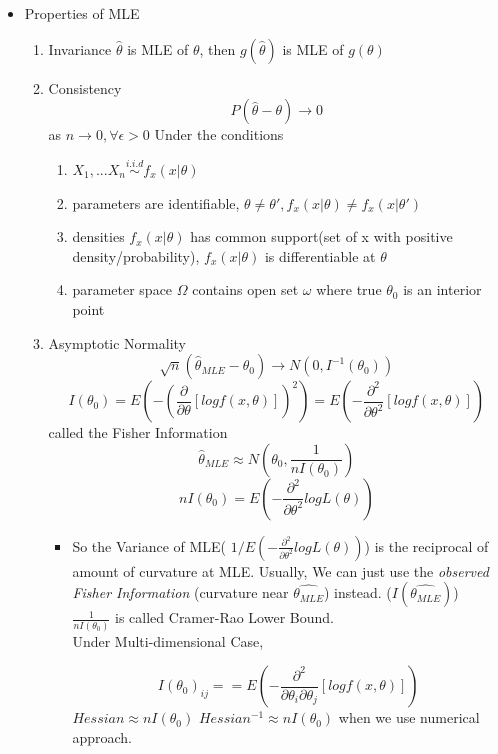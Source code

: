 \documentclass[11pt, openany]{book}              %
\begin{document}
\begin{itemize}
    \item Properties of MLE
    	\begin{enumerate}
    		\item Invariance $\hat{\theta}$ is MLE of $\theta$, then $g(\hat{\theta})$ is MLE of $g(\theta)$
    		\item Consistency $$P(\hat{\theta} - \theta ) \rightarrow 0$$ as $n \rightarrow 0, \forall \epsilon > 0$ Under the conditions
    		\begin{enumerate}
    			\item $X_1,...X_n \stackrel{i.i.d}{\sim} f_x(x|\theta)$
    			\item parameters are identifiable, $\theta \neq \theta', f_x(x|\theta) \neq f_x(x|\theta')$
    			\item densities $f_x(x|\theta)$ has common support(set of x with positive density/probability), $f_x(x|\theta)$ is differentiable at $\theta$
    			\item parameter space $\Omega$ contains open set $\omega$ where true $\theta_0$ is an interior point
    		\end{enumerate}
    		\item Asymptotic Normality 
    		$$ \sqrt{n}(\hat{\theta}_{MLE} - \theta_0) \rightarrow N(0, I^{-1}(\theta_0)) $$
    		$$ I(\theta_0) = E( -(\frac{\partial}{\partial \theta} [log f(x, \theta ) ])^2)=E(-\frac{\partial^2}{\partial \theta^2} [log f(x, \theta ) ] )$$ 
    		called the Fisher Information
    		$$ \hat{\theta}_{MLE} \approx N(\theta_0, \frac{1}{n I(\theta_0)})$$
    		$$ n I(\theta_0) = E( -\frac{\partial^2}{\partial \theta^2} log L(\theta) )$$
    		\begin{itemize}
    		\item	So the Variance of MLE( $1/ E( -\frac{\partial^2}{\partial \theta^2} log L(\theta) )$) is the reciprocal of amount of curvature at MLE. 
    			Usually, We can just use the \textit{observed Fisher Information} (curvature near $\hat{\theta_{MLE}}$) instead. ($I(\hat{\theta_{MLE}})$) \\
    		$\frac{1}{ n I(\theta_0)}$ is called Cramer-Rao Lower Bound. \\ Under Multi-dimensional Case, 
    		
    			$$ I(\theta_0)_{ij} = =E(-\frac{\partial^2}{\partial \theta_i \partial \theta_j} [log f(x, \theta ) ] )$$ $Hessian \approx nI(\theta_0)$ $Hessian^{-1} \approx nI(\theta_0)$ when we use numerical approach. 


\end{itemize}
\end{enumerate}
\end{itemize}
\end{document}
